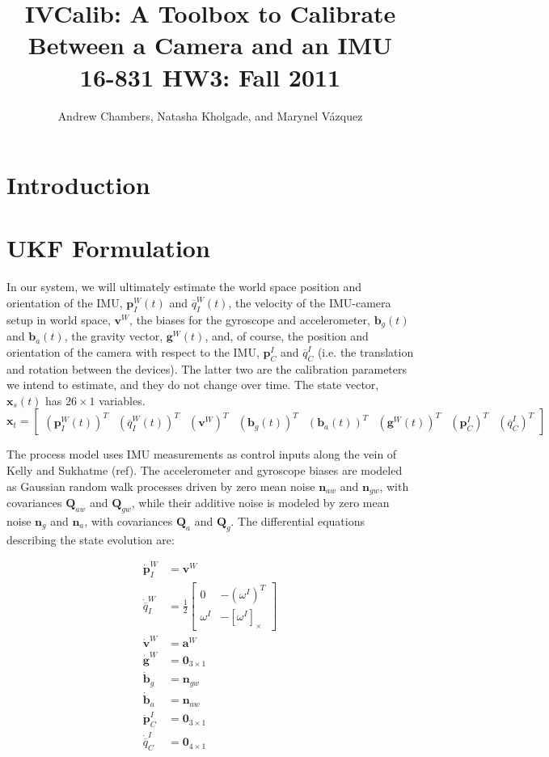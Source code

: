 \documentclass[letterpaper]{article}
\title{
  IVCalib: A Toolbox to Calibrate Between a Camera and an IMU\\
  \Large{16-831 HW3: Fall 2011}
}
\author{Andrew Chambers, Natasha Kholgade, and Marynel V\'azquez}
\date{}
\newcommand{\bb}[1]{\mathbf{#1}}
\begin{document}
\maketitle

\section{Introduction}

\section{UKF Formulation}
\label{sec:UKF}

In our system, we will ultimately estimate the world space position and orientation of the IMU, $\bb{p}_I^W(t)$ and ${\overline{q}}_I^W(t)$, the velocity of the IMU-camera setup in world space, $\bb{v}^W$, the biases for the gyroscope and accelerometer, $\bb{b}_g(t)$ and $\bb{b}_a(t)$, the gravity vector, $\bb{g}^W(t)$, and, of course, the position and orientation of the camera with respect to the IMU, $\bb{p}_C^I$ and $\overline{q}_C^I$ (i.e. the translation and rotation between the devices). The latter two are the calibration parameters we intend to estimate, and they do not change over time. The state vector, $\bb{x}_s(t)$ has $26 \times 1$ variables.
\begin{equation}
\bb{x}_t=\begin{bmatrix} (\bb{p}_I^W(t))^T & ({\overline{q}}_I^W(t))^T  & (\bb{v}^W)^T  & (\bb{b}_g(t))^T &  (\bb{b}_a(t))^T & (\bb{g}^W(t))^T  & (\bb{p}_C^I)^T & (\overline{q}_C^I)^T\end{bmatrix}
\label{eq:UKF-state}
\end{equation}

The process model uses IMU measurements as control inputs along the vein of Kelly and Sukhatme (ref). The accelerometer and gyroscope biases are modeled as Gaussian random walk processes driven by zero mean noise $\bb{n}_{aw}$ and $\bb{n}_{gw}$, with covariances $\bb{Q}_{aw}$ and $\bb{Q}_{gw}$, while their additive noise is modeled by zero mean noise $\bb{n}_g$ and $\bb{n}_a$, with covariances $\bb{Q}_a$ and $\bb{Q}_g$. The differential equations describing the state evolution are:

\begin{align}
\dot{\bb{p}}_I^W &=\bb{v}^W \nonumber\\ 
\dot{\overline{q}}_I^W&=\frac{1}{2}\begin{bmatrix}0 & -(\omega^I)^T \\ \omega^I & -[ \omega^I ]_{\times} \end{bmatrix}  \nonumber\\
\dot{\bb{v}}^W &=\bb{a}^W  \nonumber\\
\dot{\bb{g}}^W &=\bb{0}_{3 \times 1}  \nonumber\\
\dot{\bb{b}}_g&=\bb{n}_{gw}  \nonumber\\
\dot{\bb{b}}_a&=\bb{n}_{aw}  \nonumber\\
\dot{\bb{p}}_C^I&=\bb{0}_{3 \times 1} \nonumber\\
\dot{\overline{q}}_C^I&=\bb{0}_{4 \times 1}
\end{align}
\end{document}
